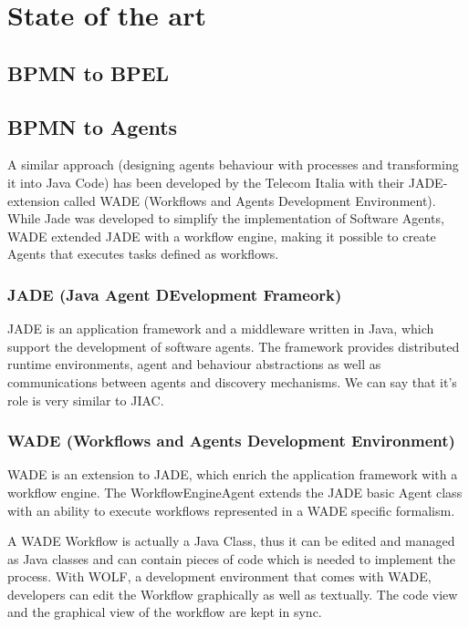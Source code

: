 \chapter{State of the art}

\section{BPMN to BPEL}



\section{BPMN to Agents}
A similar approach (designing agents behaviour with processes and transforming it into Java Code) has been developed by the Telecom Italia with their JADE-extension called WADE (Workflows and Agents Development Environment). While Jade was developed to simplify the implementation of Software Agents, WADE extended JADE with a workflow engine, making it possible to create Agents that executes tasks defined as workflows.

\subsection{JADE (\textbf{J}ava \textbf{A}gent \textbf{DE}velopment Frameork)}
JADE is an application framework and a middleware written in Java, which support the development of software agents. The framework  provides distributed runtime environments, agent and behaviour abstractions as well as communications between agents and discovery mechanisms. We can say that it's role is very similar to JIAC.

\subsection{WADE (Workflows and Agents Development Environment)}
WADE is an extension to JADE, which enrich the application framework with a workflow engine. The WorkflowEngineAgent extends the JADE basic Agent class with an ability to execute workflows represented in a WADE specific formalism.

A WADE Workflow is actually a Java Class, thus it can be edited and managed as Java classes and can contain pieces of code which is needed to implement the process. With WOLF, a development environment that comes with WADE, developers can edit the Workflow graphically as well as textually. The code view and the graphical view of the workflow are kept in sync. 


